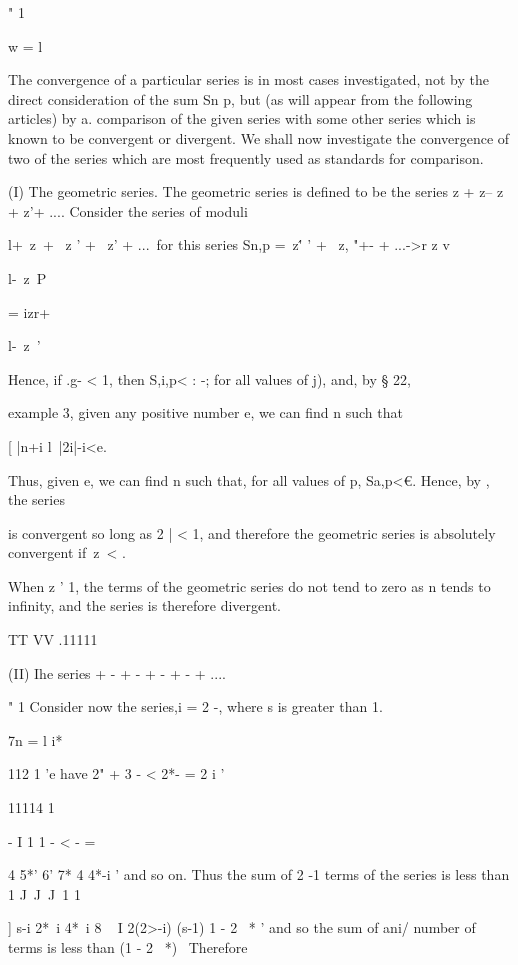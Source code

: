 " 1

w = l

The convergence of a particular series is in most cases investigated,
not by the direct consideration of the sum Sn p, but (as will appear
from the following articles) by a. comparison of the given series with
some other series which is known to be convergent or divergent. We
shall now investigate the convergence of two of the series which are
most frequently used as standards for comparison.

%
%

(I) The geometric series. The geometric series is defined to be the
series z + z-- z + z'+ .... Consider the series of moduli

l+\ z\ + \ z ' + \ z' + ...\ for this series Sn,p =\ z\'' ' + \ z, "+-
+ ...->r z v

l-\ z\ P

= izr+

l-\ z\ '

Hence, if .g- < 1, then S,i,p< : -; for all values of j), and, by §
22,

example 3, given any positive number e, we can find n such that

[ |n+i l\ |2i|-i<e.

Thus, given e, we can find n such that, for all values of p, Sa,p<€.
Hence, by , the series

is convergent so long as 2 | < 1, and therefore the geometric series
is absolutely convergent if\ z\ < .

When z ' 1, the terms of the geometric series do not tend to zero as n
tends to infinity, and the series is therefore divergent.

TT VV .11111

(II) Ihe series + - + - + - + - + ....

" 1 Consider now the series,i = 2 -, where s is greater than 1.

7n = l i*

112 1 'e have 2" + 3 - < 2*- = 2 i '

11114 1

- I 1 1 - < - =

4 5*' 6' 7* 4 4*-i ' and so on. Thus the sum of 2 -1 terms of the
series is less than 1 J\ J\ J\ 1 1

] s-i 2*~i 4*~i 8 ~  I 2(2>-i) (s-1) 1 - 2 ~* ' and so the sum of
ani/ number of terms is less than (1 - 2 ~*)~ Therefore

